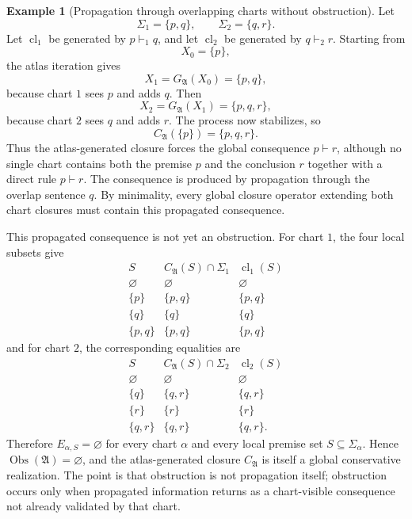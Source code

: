 \documentclass[11pt]{amsart}
\numberwithin{equation}{section}
\theoremstyle{plain}
\theoremstyle{definition}
\newtheorem{example}[theorem]{Example}
\theoremstyle{remark}
\newcommand{\Cl}{\operatorname{cl}}
\newcommand{\A}{\mathfrak A}
\newcommand{\Sig}{\Sigma}
\newcommand{\Obs}{\operatorname{Obs}}
\newcommand{\CA}{C_{\mathfrak A}}
\newcommand{\GA}{G_{\mathfrak A}}
\begin{document}
\begin{example}[Propagation through overlapping charts without obstruction]
\label{ex:propagation-through-charts}
Let
\[
  \Sig_1=\{p,q\},\qquad \Sig_2=\{q,r\}.
\]
Let \(\Cl_1\) be generated by \(p\vdash_1 q\), and let \(\Cl_2\) be generated by \(q\vdash_2 r\).  Starting from
\[
  X_0=\{p\},
\]
the atlas iteration gives
\[
  X_1=\GA(X_0)=\{p,q\},
\]
because chart \(1\) sees \(p\) and adds \(q\).  Then
\[
  X_2=\GA(X_1)=\{p,q,r\},
\]
because chart \(2\) sees \(q\) and adds \(r\).  The process now stabilizes, so
\[
  \CA(\{p\})=\{p,q,r\}.
\]
Thus the atlas-generated closure forces the global consequence \(p\vdash r\), although no single chart contains both the premise \(p\) and the conclusion \(r\) together with a direct rule \(p\vdash r\).  The consequence is produced by propagation through the overlap sentence \(q\).  By minimality, every global closure operator extending both chart closures must contain this propagated consequence.

This propagated consequence is not yet an obstruction.  For chart \(1\), the four local subsets give
\[
\begin{array}{c|c|c}
S & \CA(S)\cap\Sig_1 & \Cl_1(S)\\
\hline
\varnothing & \varnothing & \varnothing\\
\{p\} & \{p,q\} & \{p,q\}\\
\{q\} & \{q\} & \{q\}\\
\{p,q\} & \{p,q\} & \{p,q\}
\end{array}
\]
and for chart \(2\), the corresponding equalities are
\[
\begin{array}{c|c|c}
S & \CA(S)\cap\Sig_2 & \Cl_2(S)\\
\hline
\varnothing & \varnothing & \varnothing\\
\{q\} & \{q,r\} & \{q,r\}\\
\{r\} & \{r\} & \{r\}\\
\{q,r\} & \{q,r\} & \{q,r\}.
\end{array}
\]
Therefore \(E_{\alpha,S}=\varnothing\) for every chart \(\alpha\) and every local premise set \(S\subseteq\Sig_\alpha\).  Hence \(\Obs(\A)=\varnothing\), and the atlas-generated closure \(\CA\) is itself a global conservative realization.  The point is that obstruction is not propagation itself; obstruction occurs only when propagated information returns as a chart-visible consequence not already validated by that chart.

\begin{figure}[!htbp]
\centering
{}
\end{figure}
\end{example}
\end{document}
